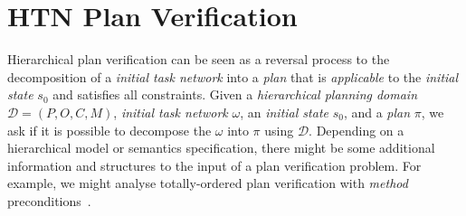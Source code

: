 \section{HTN Plan Verification}

\medskip\noindent
Hierarchical plan verification can be seen as a reversal process to the decomposition of a \emph{initial task network} into a \emph{plan} that is \emph{applicable} to the \emph{initial state} $s_0$ and satisfies all constraints. Given a \emph{hierarchical planning domain} $\mathcal{D} = (P, O, C, M)$, \emph{initial task network} $\omega$, an \emph{initial state} $s_0$, and a \emph{plan} $\pi$, we ask if it is possible to decompose the $\omega$ into $\pi$ using $\mathcal{D}$. Depending on a hierarchical model or semantics specification, there might be some additional information and structures to the input of a plan verification problem. For example, we might analyse totally-ordered plan verification with \emph{method} preconditions~\cite{cmyk}.
